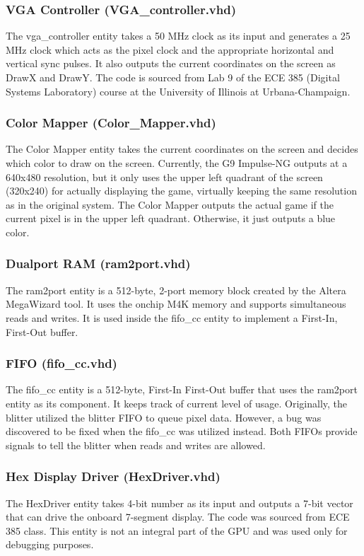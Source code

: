 \documentclass{report}
\begin{document}
\subsubsection{VGA Controller (VGA\_controller.vhd)}
The vga\_controller entity takes a 50 MHz clock as its input and 
generates a 25 MHz clock which acts as the pixel clock and the 
appropriate horizontal and vertical sync pulses. It also outputs the 
current coordinates on the screen as DrawX and DrawY. The code is 
sourced from Lab 9 of the ECE 385 (Digital Systems Laboratory) course at 
the University of Illinois at Urbana-Champaign.

\subsubsection{Color Mapper (Color\_Mapper.vhd)}
The Color Mapper entity takes the current coordinates on the screen and 
decides which color to draw on the screen. Currently, the G9 Impulse-NG 
outputs at a 640x480 resolution, but it only uses the upper left
quadrant of the screen (320x240) for actually displaying the game,
virtually keeping the same resolution as in the original system. The 
Color Mapper outputs the actual game if the current pixel is in the 
upper left quadrant. Otherwise, it just outputs a blue color.

\subsubsection{Dualport RAM (ram2port.vhd)}
The ram2port entity is a 512-byte, 2-port memory block created by the 
Altera MegaWizard tool. It uses the onchip M4K memory and supports 
simultaneous reads and writes. It is used inside the fifo\_cc entity to 
implement a First-In, First-Out buffer.

\subsubsection{FIFO (fifo\_cc.vhd)}
The fifo\_cc entity is a 512-byte, First-In First-Out buffer that uses 
the ram2port entity as its component. It keeps track of current level of 
usage. Originally, the blitter utilized the blitter FIFO to queue pixel 
data. However, a bug was discovered to be fixed when the fifo\_cc was 
utilized instead. Both FIFOs provide signals to tell the blitter when 
reads and writes are allowed.

\subsubsection{Hex Display Driver (HexDriver.vhd)}
The HexDriver entity takes 4-bit number as its input and outputs a 7-bit 
vector that can drive the onboard 7-segment display. The code was 
sourced from ECE 385 class. This entity is not an integral part of the 
GPU and was used only for debugging purposes.
\end{document}
